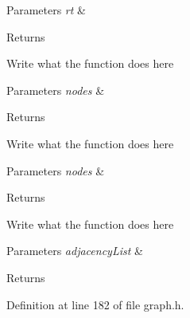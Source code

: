 \begin{DoxyParams}{Parameters}
{\em rt} & \\
\hline
\end{DoxyParams}
\begin{DoxyReturn}{Returns}

\end{DoxyReturn}
Write what the function does here


\begin{DoxyParams}{Parameters}
{\em nodes} & \\
\hline
\end{DoxyParams}
\begin{DoxyReturn}{Returns}

\end{DoxyReturn}
Write what the function does here


\begin{DoxyParams}{Parameters}
{\em nodes} & \\
\hline
\end{DoxyParams}
\begin{DoxyReturn}{Returns}

\end{DoxyReturn}
Write what the function does here


\begin{DoxyParams}{Parameters}
{\em adjacency\+List} & \\
\hline
\end{DoxyParams}
\begin{DoxyReturn}{Returns}

\end{DoxyReturn}


Definition at line 182 of file graph.\+h.


